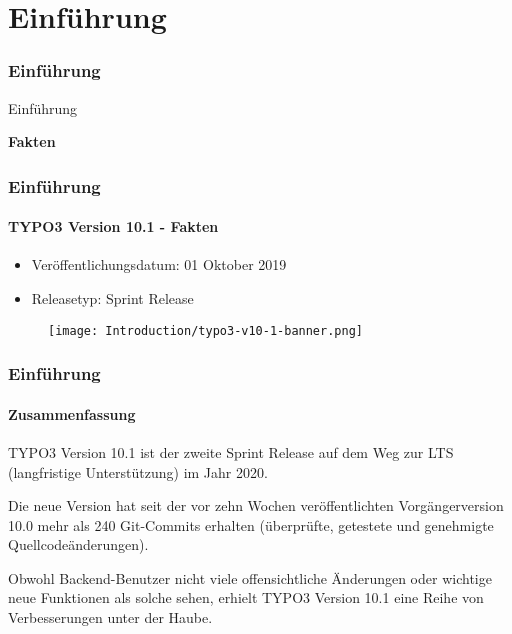 %

\section{Einführung}
\begin{frame}[fragile]
	\frametitle{Einführung}

	\begin{center}\huge{Einführung}\end{center}
	\begin{center}\huge{\color{typo3darkgrey}\textbf{Fakten}}\end{center}

\end{frame}


\begin{frame}[fragile]
	\frametitle{Einführung}
	\framesubtitle{TYPO3 Version 10.1 - Fakten}

	\begin{itemize}
		\item Veröffentlichungsdatum: 01 Oktober 2019
		\item Releasetyp: Sprint Release
	\end{itemize}

	\begin{figure}
		\texttt{[image: Introduction/typo3-v10-1-banner.png]}
	\end{figure}

\end{frame}


\begin{frame}[fragile]
	\frametitle{Einführung}
	\framesubtitle{Zusammenfassung}

	\small
		TYPO3 Version 10.1 ist der zweite Sprint Release auf dem Weg zur LTS
		(langfristige Unterstützung) im Jahr 2020.

		\vspace{0.2cm}

		Die neue Version hat seit der vor zehn Wochen veröffentlichten Vorgängerversion
		10.0 mehr als 240 Git-Commits erhalten (überprüfte, getestete und genehmigte 
		Quellcodeänderungen).

		\vspace{0.2cm}

		Obwohl Backend-Benutzer nicht viele offensichtliche Änderungen oder wichtige neue
		Funktionen als solche sehen, erhielt TYPO3 Version 10.1 eine Reihe von Verbesserungen unter der Haube.

	\normalsize

\end{frame}

